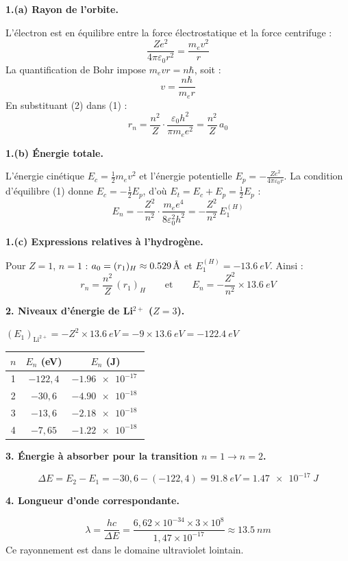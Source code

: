 \documentclass[12pt,a4paper]{article}
\begin{document}
\begin{boitecorrige}
\textbf{1.(a) Rayon de l'orbite.}

L'électron est en équilibre entre la force électrostatique et la force centrifuge :
\[
\frac{Ze^2}{4\pi\varepsilon_0 r^2} = \frac{m_e v^2}{r} \tag{1}
\]
La quantification de Bohr impose $m_e v r = n\hbar$, soit :
\[
v = \frac{n\hbar}{m_e r} \tag{2}
\]
En substituant (2) dans (1) :
\[
\boxed{r_n = \frac{n^2}{Z}\cdot\frac{\varepsilon_0 h^2}{\pi m_e e^2} = \frac{n^2}{Z}\,a_0}
\]

\textbf{1.(b) Énergie totale.}

L'énergie cinétique $E_c = \frac{1}{2}m_e v^2$ et l'énergie potentielle $E_p = -\frac{Ze^2}{4\pi\varepsilon_0 r}$. La condition d'équilibre (1) donne $E_c = -\frac{1}{2}E_p$, d'où $E_t = E_c + E_p = \frac{1}{2}E_p$ :
\[
\boxed{E_n = -\frac{Z^2}{n^2}\cdot\frac{m_e e^4}{8\varepsilon_0^2 h^2} = -\frac{Z^2}{n^2}\,E_1^{(H)}}
\]

\textbf{1.(c) Expressions relatives à l'hydrogène.}

Pour $Z=1$, $n=1$ : $a_0 = (r_1)_H \approx \num{0.529}\,\text{\AA}$ et $E_1^{(H)} = -\qty{13.6}{eV}$. Ainsi :
\[
r_n = \frac{n^2}{Z}\,(r_1)_H \qquad \text{et} \qquad E_n = -\frac{Z^2}{n^2}\times\qty{13.6}{eV}
\]

\textbf{2. Niveaux d'énergie de Li$^{2+}$ ($Z=3$).}

$(E_1)_{\text{Li}^{2+}} = -Z^2 \times \qty{13.6}{eV} = -9 \times \qty{13.6}{eV} = \qty{-122.4}{eV}$

\begin{center}
\begin{tabular}{ccc}
\toprule
$n$ & $E_n$ (eV) & $E_n$ (J) \\
\midrule
1 & $-122{,}4$ & $\qty{-1.96e-17}{}$ \\
2 & $-30{,}6$ & $\qty{-4.90e-18}{}$ \\
3 & $-13{,}6$ & $\qty{-2.18e-18}{}$ \\
4 & $-7{,}65$ & $\qty{-1.22e-18}{}$ \\
\bottomrule
\end{tabular}
\end{center}

\textbf{3. Énergie à absorber pour la transition $n=1 \to n=2$.}

\[
\Delta E = E_2 - E_1 = -30{,}6 - (-122{,}4) = \qty{91.8}{eV} = \qty{1.47e-17}{J}
\]

\textbf{4. Longueur d'onde correspondante.}

\[
\lambda = \frac{hc}{\Delta E} = \frac{6{,}62\times10^{-34}\times3\times10^8}{1{,}47\times10^{-17}} \approx \qty{13.5}{nm}
\]
Ce rayonnement est dans le domaine ultraviolet lointain.
\end{boitecorrige}
\end{document}
